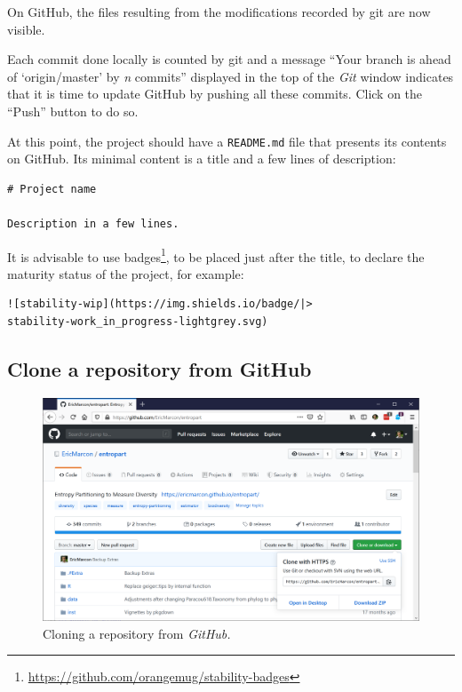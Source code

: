 \documentclass[
  12pt,
  american,
  a4paper,
  extrafontsizes,onecolumn,openright
  ]{memoir}
\begin{document}
On GitHub, the files resulting from the modifications recorded by git are now visible.

Each commit done locally is counted by git and a message \enquote{Your branch is ahead of \enquote*{origin/master} by \emph{n} commits} displayed in the top of the \emph{Git} window indicates that it is time to update GitHub by pushing all these commits.
Click on the \enquote{Push} button to do so.

At this point, the project should have a \texttt{README.md} file that presents its contents on GitHub.
Its minimal content is a title and a few lines of description:

\begin{verbatim}
# Project name

Description in a few lines.
\end{verbatim}

It is advisable to use badges\footnote{\url{https://github.com/orangemug/stability-badges}}, to be placed just after the title, to declare the maturity status of the project, for example:

\begin{verbatim}
![stability-wip](https://img.shields.io/badge/|>
stability-work_in_progress-lightgrey.svg)
\end{verbatim}

\subsection{Clone a repository from GitHub}\label{clone-a-repository-from-github}



\scriptsize

\begin{figure}

{\centering \includegraphics[width=0.8\linewidth]{images/git-Clone} 

}

\caption{Cloning a repository from \emph{GitHub.}}\label{fig:git-Clone}
\end{figure}
\end{document}
